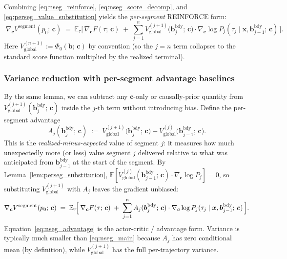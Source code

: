 \documentclass[11pt,a4paper]{article}
\newcommand{\bc}{\bm{c}}
\newcommand{\bx}{\bm{x}}
\newcommand{\bb}{\bm{b}}
\newcommand{\E}{\mathbb{E}}
\begin{document}
Combining \eqref{eq:nseg_reinforce}, \eqref{eq:nseg_score_decomp}, and
\eqref{eq:perseg_value_substitution} yields the \emph{per-segment} REINFORCE form:
\begin{equation}
\boxed{\;
\nabla_{\bc} V^\mathrm{segment}(p_0;\, \bc)
\;=\;
\E_\tau\!\biggl[\,
\nabla_{\bc} F(\tau;\, \bc)
\;+\;
\sum_{j=1}^{n} V_{\mathrm{global}}^{(j+1)}\!\bigl(\bb^{\mathrm{bdy}}_j;\, \bc\bigr) \cdot \nabla_{\bc} \log P_j(\tau_j \mid \bx, \bb^{\mathrm{bdy}}_{j-1};\, \bc)
\,\biggr].
\;}
\label{eq:nseg_main}
\end{equation}
Here $V_{\mathrm{global}}^{(n+1)} := \Phi_0(\bb;\, \bc)$ by convention (so the $j = n$ term
collapses to the standard score function multiplied by the realized terminal).

\subsubsection{Variance reduction with per-segment advantage baselines}
\label{sec:nseg_advantage}

By the same lemma, we can subtract any $\bc$-only or causally-prior quantity from
$V_{\mathrm{global}}^{(j+1)}(\bb^{\mathrm{bdy}}_j;\, \bc)$ inside the $j$-th term without
introducing bias.  Define the per-segment advantage
\begin{equation}
A_j(\bb^{\mathrm{bdy}}_j;\, \bc) \;:=\; V_{\mathrm{global}}^{(j+1)}\!\bigl(\bb^{\mathrm{bdy}}_j;\, \bc\bigr) - V_{\mathrm{global}}^{(j)}\!\bigl(\bb^{\mathrm{bdy}}_{j-1};\, \bc\bigr).
\label{eq:advantage}
\end{equation}
This is the \emph{realized-minus-expected} value of segment $j$: it measures how much
unexpectedly more (or less) value segment $j$ delivered relative to what was anticipated
from $\bb^{\mathrm{bdy}}_{j-1}$ at the start of the segment.  By
Lemma~\ref{lem:perseg_substitution}, $\E[V_{\mathrm{global}}^{(j)}(\bb^{\mathrm{bdy}}_{j-1};\, \bc) \cdot \nabla_{\bc} \log P_j] = 0$, so substituting $V_{\mathrm{global}}^{(j+1)}$ with $A_j$ leaves the gradient unbiased:
\begin{equation}
\nabla_{\bc} V^\mathrm{segment}(p_0;\, \bc)
\;=\;
\E_\tau\!\Bigl[\,
\nabla_{\bc} F(\tau;\, \bc)
\;+\;
\sum_{j=1}^{n} A_j(\bb^{\mathrm{bdy}}_j;\, \bc) \cdot \nabla_{\bc} \log P_j(\tau_j \mid \bx, \bb^{\mathrm{bdy}}_{j-1};\, \bc)
\,\Bigr].
\label{eq:nseg_advantage}
\end{equation}
Equation~\eqref{eq:nseg_advantage} is the actor-critic / advantage form.  Variance is
typically much smaller than \eqref{eq:nseg_main} because $A_j$ has zero conditional mean
(by definition), while $V_{\mathrm{global}}^{(j+1)}$ has the full per-trajectory variance.
\end{document}
